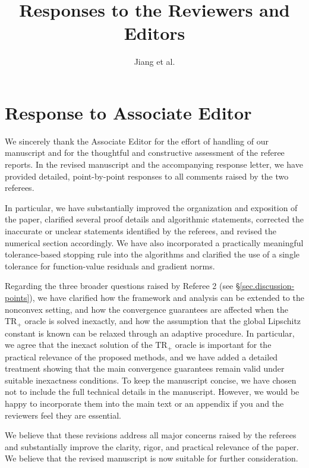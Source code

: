 \documentclass{article}
\title{Responses to the Reviewers and Editors}
\author{Jiang et al.}
\newcommand{\trp}{\textrm{TR}_+}
\begin{document}
\maketitle


\newpage
\section{Response to Associate Editor}
 {\color{blue} We sincerely thank the Associate Editor for the effort of handling of our manuscript and for the thoughtful and constructive assessment of the referee reports. 
  In the revised manuscript and the accompanying response letter, we have provided detailed, point-by-point responses to all comments raised by the two referees.

  In particular, we have substantially improved the organization and exposition of the paper, clarified several proof details and algorithmic statements, corrected the inaccurate or unclear statements identified by the referees, and revised the numerical section accordingly. We have also incorporated a practically meaningful tolerance-based stopping rule into the algorithms and clarified the use of a single tolerance for function-value residuals and gradient norms.

  Regarding the three broader questions raised by Referee 2 (see \S\ref{sec.discussion-points}), we have clarified how the framework and analysis can be extended to the nonconvex setting, and how the convergence guarantees are affected when the $\trp$ oracle is solved inexactly, and how the assumption that the global Lipschitz constant is known can be relaxed through an adaptive procedure.
  In particular, we agree that the inexact solution of the $\trp$ oracle is important for the practical relevance of the proposed methods, and we have added a detailed treatment showing that the main convergence guarantees remain valid under suitable inexactness conditions. To keep the manuscript concise, we have chosen not to include the full technical details in the manuscript. However, we would be happy to incorporate them into the main text or an appendix if you and the reviewers feel they are essential.

  We believe that these revisions address all major concerns raised by the referees and substantially improve the clarity, rigor, and practical relevance of the paper. We believe that the revised manuscript is now suitable for further consideration.
 }
\newpage


\newpage



\end{document}
